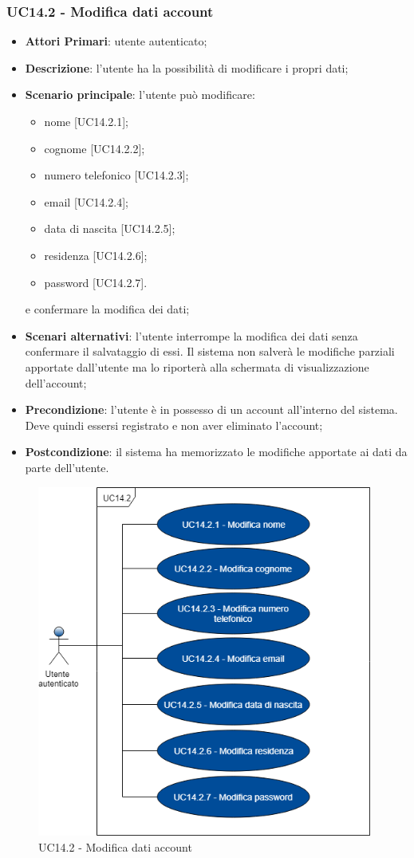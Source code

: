 \subsubsection{UC14.2 - Modifica dati account}
\begin{itemize}
	\item \textbf{Attori Primari}: utente autenticato;
	\item \textbf{Descrizione}: l'utente ha la possibilità di modificare i propri dati;
	\item \textbf{Scenario principale}: l'utente può modificare:
	\begin{itemize}
		\item nome [UC14.2.1];
		\item cognome [UC14.2.2];
		\item numero telefonico [UC14.2.3];
		\item email [UC14.2.4];
		\item data di nascita [UC14.2.5];
		\item residenza [UC14.2.6];
		\item password [UC14.2.7].
	\end{itemize}
	e confermare la modifica dei dati;
	\item \textbf{Scenari alternativi}: l'utente interrompe la modifica dei dati senza confermare il salvataggio di essi. Il sistema non salverà le modifiche parziali apportate dall'utente ma lo riporterà alla schermata di visualizzazione dell'account;	 
	\item \textbf{Precondizione}: l'utente è in possesso di un account all'interno del sistema. Deve quindi essersi registrato e non aver eliminato l'account;
	\item \textbf{Postcondizione}: il sistema ha memorizzato le modifiche apportate ai dati da parte dell’utente.
\end{itemize}
\begin{figure}[h]
	\includegraphics[width=11cm]{res/images/UC14-1Modifica.png}
	\centering
	\caption{UC14.2 - Modifica dati account}
\end{figure}
\newpage 
